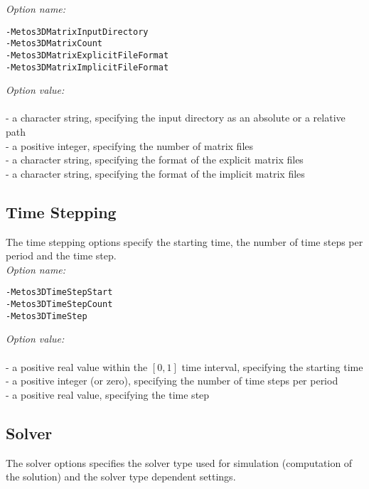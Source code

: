 \documentclass{article}
\begin{document}
\emph{Option name:}
\begin{verbatim}
-Metos3DMatrixInputDirectory
-Metos3DMatrixCount
-Metos3DMatrixExplicitFileFormat
-Metos3DMatrixImplicitFileFormat
\end{verbatim}

\emph{Option value:} \\
\vspace{-0.3cm}\\
- a character string, specifying the input directory as an absolute or a relative path \\
- a positive integer, specifying the number of matrix files \\
- a character string, specifying the format of the explicit matrix files \\
- a character string, specifying the format of the implicit matrix files \\

%
%
\subsection{Time Stepping}

The time stepping options specify the starting time, the number of
time steps per period and the time step. \\

\emph{Option name:}
\begin{verbatim}
-Metos3DTimeStepStart
-Metos3DTimeStepCount
-Metos3DTimeStep
\end{verbatim}

\emph{Option value:} \\
\vspace{-0.3cm}\\
- a positive real value within the $[0, 1]$ time interval, specifying the starting time \\
- a positive integer (or zero), specifying the number of time steps per period \\
- a positive real value, specifying the time step \\

%
%
\subsection{Solver}
\label{Solver}

The solver options specifies the solver type used for simulation
(computation of the solution) and the solver type dependent settings. \\
\end{document}
